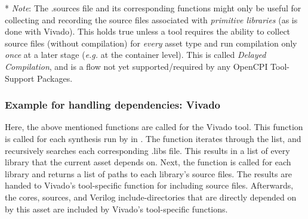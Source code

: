 \begin{itemize}
	* \textit{Note}: The .sources file and its corresponding functions might only be useful for collecting and recording the source files associated with \textit{primitive libraries} (as is done with Vivado). This holds true unless a tool requires the ability to collect source files (without compilation) for \textit{every} asset type and run compilation only \textit{once} at a later stage (\textit{e.g.} at the container level). This is called \textit{Delayed Compilation}, and is a flow not yet supported/required by any OpenCPI Tool-Support Packages.\setlength{\leftskip}{1cm}
\end{itemize}
\subsubsection{Example for handling dependencies: Vivado}
Here, the above mentioned functions are called for the Vivado tool. This  function is called for each synthesis run by  in . The  function iterates through the  list, and recursively searches each corresponding .libs file. This results in a list of every library that the current asset depends on. Next, the  function is called for each library and returns a list of paths to each library's source files. The results are handed to Vivado's tool-specific function for including source files. Afterwards, the cores, sources, and Verilog include-directories that are directly depended on by this asset are included by Vivado's tool-specific functions.\newline

\newline
\setlength{\parindent}{1cm}
\indent  {}\newline
\indent\indent    {}\newline
\indent\indent\indent      {}\newline
\indent\indent\indent      {}\newline
\indent  {}\newline
\indent  {}\newline
\indent\indent  {}\newline
\indent  {}\newline
\indent\indent  {}\newline
\indent\indent  {}\newline


